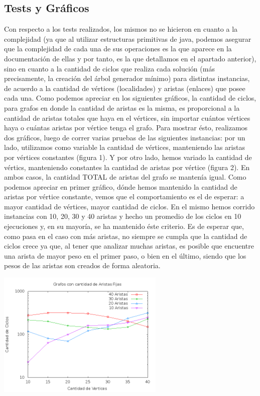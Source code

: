 \subsection{Tests y Gráficos}
Con respecto a los tests realizados, los mismos no se hicieron en cuanto a la complejidad (ya que al utilizar estructuras primitivas de java, podemos asegurar que la complejidad de cada una de sus operaciones es la que aparece en la documentación de ellas y por tanto, es la que detallamos en el apartado anterior), sino en cuanto a la cantidad de ciclos que realiza cada solución (más precisamente, la creación del árbol generador mínimo) para distintas instancias, de acuerdo a la cantidad de vértices (localidades) y aristas (enlaces) que posee cada una.
Como podemos apreciar en los siguientes gráficos, la cantidad de ciclos, para grafos en donde la cantidad de aristas es la misma, es proporcional a la cantidad de aristas totales que haya en el vértices, sin importar cuántos vértices haya o cuántas aristas por vértice tenga el grafo.
Para mostrar ésto, realizamos dos gráficos, luego de correr varias pruebas de las siguientes instancias: por un lado, utilizamos como variable la cantidad de vértices, manteniendo las aristas por vértices constantes (figura 1). Y por otro lado, hemos variado la cantidad de vértics, manteniendo constantes la cantidad de aristas por vértice (figura 2). En ambos casos, la cantidad TOTAL de aristas del grafo se mantenía igual.
Como podemos apreciar en primer gráfico, dónde hemos mantenido la cantidad de aristas por vértice constante, vemos que el comportamiento es el de esperar: a mayor cantidad de vértices, mayor cantidad de ciclos.  En el mismo hemos corrido instancias con 10, 20, 30 y 40 aristas y hecho un promedio de los ciclos en 10 ejecuciones y, en su mayoría, se ha mantenido éste criterio. Es de esperar que, como pasa en el caso con más aristas, no siempre se cumpla que la cantidad de ciclos crece ya que, al tener que analizar muchas aristas, es posible que encuentre una arista de mayor peso en el primer paso, o bien en el último, siendo que los pesos de las aristas son creados de forma aleatoria.
\begin {center}
\includegraphics[width=8cm]{./graficos/graficos_aristas_fijas.png}
\end {center} 

